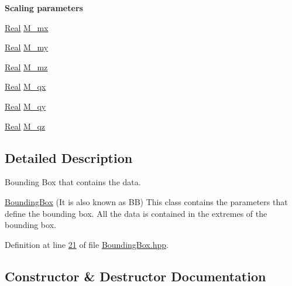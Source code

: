 \begin{Indent}{\bf Scaling parameters}\par
\begin{DoxyCompactItemize}
\item 
\hyperlink{namespaceFVCode3D_a40c1f5588a248569d80aa5f867080e83}{Real} \hyperlink{classFVCode3D_1_1BoundingBox_af04126840f535e71790de13610143e99}{M\+\_\+mx}
\item 
\hyperlink{namespaceFVCode3D_a40c1f5588a248569d80aa5f867080e83}{Real} \hyperlink{classFVCode3D_1_1BoundingBox_a03fcb585dc23713587dabbda552d1300}{M\+\_\+my}
\item 
\hyperlink{namespaceFVCode3D_a40c1f5588a248569d80aa5f867080e83}{Real} \hyperlink{classFVCode3D_1_1BoundingBox_afb2a862118bf93c3a1ed3f023b02f578}{M\+\_\+mz}
\item 
\hyperlink{namespaceFVCode3D_a40c1f5588a248569d80aa5f867080e83}{Real} \hyperlink{classFVCode3D_1_1BoundingBox_a3df507cc3ea395afe58e271683a03882}{M\+\_\+qx}
\item 
\hyperlink{namespaceFVCode3D_a40c1f5588a248569d80aa5f867080e83}{Real} \hyperlink{classFVCode3D_1_1BoundingBox_a113d0fbdda96cd1f9673ee1bf8c82c32}{M\+\_\+qy}
\item 
\hyperlink{namespaceFVCode3D_a40c1f5588a248569d80aa5f867080e83}{Real} \hyperlink{classFVCode3D_1_1BoundingBox_a1019b2f83e6feda1395654f930950d02}{M\+\_\+qz}
\end{DoxyCompactItemize}
\end{Indent}


\subsection{Detailed Description}
Bounding Box that contains the data. 

\hyperlink{classFVCode3D_1_1BoundingBox}{Bounding\+Box} (It is also known as BB) This class contains the parameters that define the bounding box. All the data is contained in the extremes of the bounding box. 

Definition at line \hyperlink{BoundingBox_8hpp_source_l00021}{21} of file \hyperlink{BoundingBox_8hpp_source}{Bounding\+Box.\+hpp}.



\subsection{Constructor \& Destructor Documentation}
